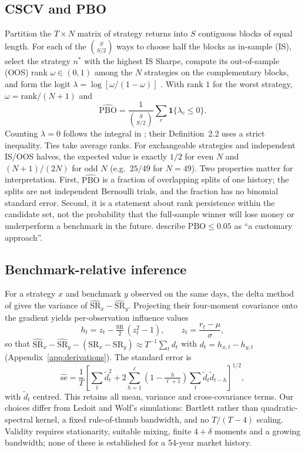 \documentclass[11pt,a4paper]{article}
\newcommand{\SR}{\mathrm{SR}}
\newcommand{\hSR}{\widehat{\mathrm{SR}}}
\theoremstyle{remark}
\begin{document}
\subsection{CSCV and PBO}
Partition the $T\times N$ matrix of strategy returns into $S$ contiguous blocks of equal length. For each of the $\binom{S}{S/2}$ ways to choose half the blocks as in-sample (IS), select the strategy $n^\ast$ with the highest IS Sharpe, compute its out-of-sample (OOS) rank $\omega\in(0,1)$ among the $N$ strategies on the complementary blocks, and form the logit $\lambda=\log[\omega/(1-\omega)]$ \citep[Algorithm~2.3, pp.~11--12]{bailey2017pbo}. With rank $1$ for the worst strategy, $\omega=\mathrm{rank}/(N+1)$ and
\begin{equation}\label{eq:pbo}
\widehat{\mathrm{PBO}}=\frac{1}{\binom{S}{S/2}}\sum_{c}\mathbf 1\{\lambda_c\le0\}.
\end{equation}
Counting $\lambda=0$ follows the integral in \citet[Sec.~3.1, p.~13]{bailey2017pbo}; their Definition~2.2 uses a strict inequality. Ties take average ranks. For exchangeable strategies and independent IS/OOS halves, the expected value is exactly $1/2$ for even $N$ and $(N+1)/(2N)$ for odd $N$ (e.g.\ $25/49$ for $N=49$). Two properties matter for interpretation. First, $\widehat{\mathrm{PBO}}$ is a fraction of overlapping splits of one history; the splits are not independent Bernoulli trials, and the fraction has no binomial standard error. Second, it is a statement about rank persistence within the candidate set, not the probability that the full-sample winner will lose money or underperform a benchmark in the future. \citet[p.~14]{bailey2017pbo} describe $\mathrm{PBO}\le0.05$ as ``a customary approach''.

\subsection{Benchmark-relative inference}
For a strategy $x$ and benchmark $y$ observed on the same days, the delta method of \citet[Eqs.~1--5, p.~4, working paper]{ledoit2008} gives the variance of $\hSR_x-\hSR_y$. Projecting their four-moment covariance onto the gradient yields per-observation influence values
\begin{equation}\label{eq:influence}
h_t=z_t-\tfrac{\SR}{2}\,(z_t^2-1),\qquad z_t=\frac{r_t-\mu}{\sigma},
\end{equation}
so that $\hSR_x-\hSR_y-(\SR_x-\SR_y)\approx T^{-1}\sum_t d_t$ with $d_t=h_{x,t}-h_{y,t}$ (Appendix~\ref{app:derivations}). The standard error is
\begin{equation}\label{eq:hac}
\widehat{\mathrm{se}}=\frac1T\left[\sum_t\tilde d_t^2+2\sum_{h=1}^{\ell}\left(1-\tfrac{h}{\ell+1}\right)\sum_t\tilde d_t\tilde d_{t-h}\right]^{1/2},
\end{equation}
with $\tilde d_t$ centred. This retains all mean, variance and cross-covariance terms. Our choices differ from Ledoit and Wolf's simulations: Bartlett rather than quadratic-spectral kernel, a fixed rule-of-thumb bandwidth, and no $T/(T-4)$ scaling. Validity requires stationarity, suitable mixing, finite $4+\delta$ moments and a growing bandwidth; none of these is established for a 54-year market history.
\end{document}
